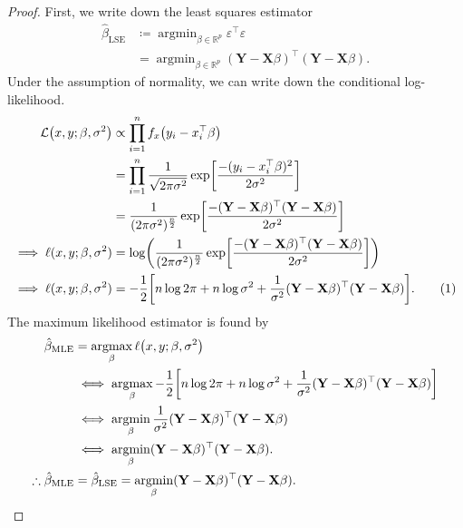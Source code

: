 \documentclass[letterpaper, reqno]{amsart}
\numberwithin{equation}{section}
\newcommand{\numberthis}{\addtocounter{equation}{1}\tag{\theequation}}
\newcommand{\T}{\top} %
\newcommand{\vect}[1]{\boldsymbol{\mathbf{#1}}} %
\newcommand{\Li}[1]{\mathcal{L}\mleft( #1 \mright)}  %
\newcommand{\R}{\mathbb{R}}  %
\newcommand{\Xm}{\vect{X}}
\newcommand{\Yv}{\vect{Y}}
\newcommand{\Bv}{\beta}
\newcommand{\Bvh}{\hat{\beta}}
\newcommand{\ve}{\varepsilon}
\DeclareMathOperator*{\argmin}{argmin}
\DeclareMathOperator*{\argmax}{argmax}
\begin{document}
\begin{proof}
  First, we write down the least squares estimator
  \begin{align*}
    \Bvh_\mathrm{LSE} &\coloneqq \argmin_{\Bv \in \R^p} \ve^\T \ve \\
                      &= \argmin_{\Bv \in \R^p} (\Yv - \Xm\Bv)^\T (\Yv - \Xm\Bv).
  \end{align*}
  Under the assumption of normality, we can write down the conditional log-likelihood.
  \begin{align*}
    \Li{x, y; \Bv, \sigma^2} &\propto \prod_{i=1}^n f_x\mleft(y_i - x_i^\T\Bv\mright) \\
    &= \prod_{i=1}^n \frac{1}{\sqrt{2\pi\sigma^2}} 
       \exp \mleft[\frac{-(y_i - x_i^\T\Bv)^2}{2\sigma^2}\mright] \\
    &= \frac{1}{(2\pi\sigma^2)^\frac{n}{2}} 
       \exp \mleft[\frac{-(\Yv - \Xm\Bv)^\T(\Yv - \Xm\Bv)}{2\sigma^2}\mright] \\
    \implies \ell(x, y; \Bv, \sigma^2) &= \log\mleft( \frac{1}{(2\pi\sigma^2)^\frac{n}{2}} 
       \exp \mleft[\frac{-(\Yv - \Xm\Bv)^\T(\Yv - \Xm\Bv)}{2\sigma^2}\mright]
       \mright) \\
    \implies \ell(x, y; \Bv, \sigma^2) &= -\frac{1}{2}\mleft[ n\log 2\pi + n \log\sigma^2 
          + \frac{1}{\sigma^2} (\Yv - \Xm\Bv)^\T(\Yv - \Xm\Bv) \mright]. \numberthis \label{eq:likelihood}
  \end{align*}
  The maximum likelihood estimator is found by
  \begin{align*}
    \Bvh_\mathrm{MLE} &= \argmax_\Bv \ell\mleft(x, y; \Bv, \sigma^2\mright) \\
    &\iff \argmax_\Bv -\frac{1}{2}\mleft[ n\log 2\pi + n\log\sigma^2 
          + \frac{1}{\sigma^2} (\Yv - \Xm\Bv)^\T(\Yv - \Xm\Bv) \mright] \\
    &\iff \argmin_\Bv \frac{1}{\sigma^2} (\Yv - \Xm\Bv)^\T(\Yv - \Xm\Bv) \\
    &\iff \argmin_\Bv (\Yv - \Xm\Bv)^\T(\Yv - \Xm\Bv). \\
    \therefore \Bvh_\mathrm{MLE} &= \Bvh_\mathrm{LSE} = \argmin_\Bv (\Yv - \Xm\Bv)^\T(\Yv - \Xm\Bv). \qedhere
  \end{align*}
\end{proof}
\end{document}
